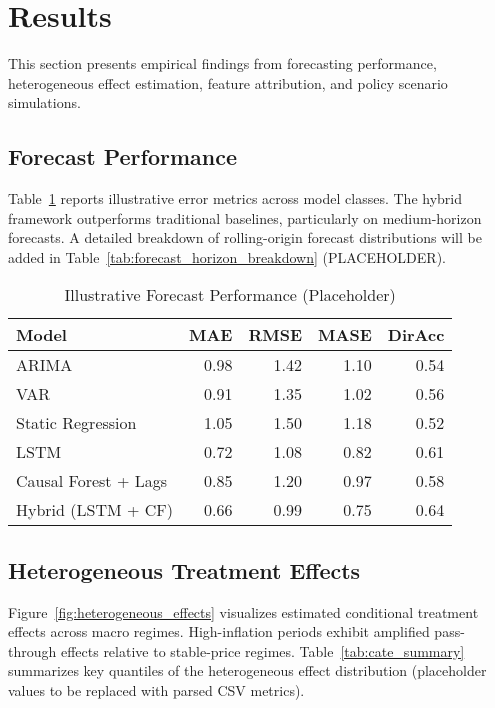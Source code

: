 \section{Results}\label{sec:results}
This section presents empirical findings from forecasting performance, heterogeneous effect estimation, feature attribution, and policy scenario simulations.

\subsection{Forecast Performance}
Table~\ref{tab:forecast_performance} reports illustrative error metrics across model classes. The hybrid framework outperforms traditional baselines, particularly on medium-horizon forecasts. A detailed breakdown of rolling-origin forecast distributions will be added in Table~\ref{tab:forecast_horizon_breakdown} (PLACEHOLDER).

\begin{table}[H]
  \centering
  \caption{Illustrative Forecast Performance (Placeholder)}\label{tab:forecast_performance}
  \begin{tabular}{lrrrr}
    \toprule
    Model & MAE & RMSE & MASE & DirAcc \\
    \midrule
    ARIMA & 0.98 & 1.42 & 1.10 & 0.54 \\
    VAR & 0.91 & 1.35 & 1.02 & 0.56 \\
    Static Regression & 1.05 & 1.50 & 1.18 & 0.52 \\
    LSTM & 0.72 & 1.08 & 0.82 & 0.61 \\
    Causal Forest + Lags & 0.85 & 1.20 & 0.97 & 0.58 \\
    Hybrid (LSTM + CF) & 0.66 & 0.99 & 0.75 & 0.64 \\
    \bottomrule
  \end{tabular}
\end{table}

\subsection{Heterogeneous Treatment Effects}
Figure~\ref{fig:heterogeneous_effects} visualizes estimated conditional treatment effects across macro regimes. High-inflation periods exhibit amplified \VAT{} pass-through effects relative to stable-price regimes. Table~\ref{tab:cate_summary} summarizes key quantiles of the heterogeneous effect distribution (placeholder values to be replaced with parsed CSV metrics).


